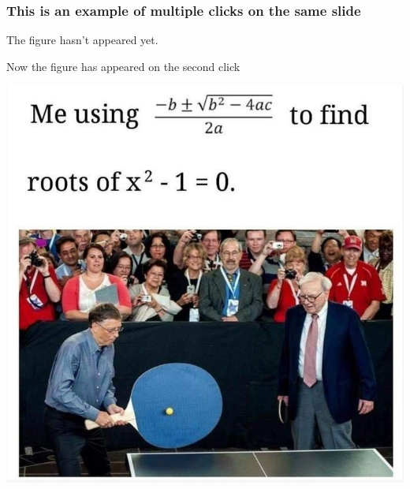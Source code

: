 \documentclass[graphics]{beamer}
\begin{document}
\begin{frame}
\frametitle{This is an example of multiple clicks on the same slide}
\begin{overprint}

The figure hasn't appeared yet. 

Now the figure has appeared on the second click
\begin{center}
	\includegraphics[width = .75\textwidth]{Figures/Histogram.jpeg}
\end{center}

\end{overprint}
\end{frame}
\end{document}
